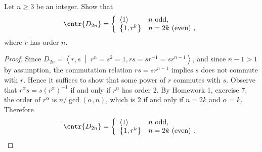 \documentclass[10pt]{amsart}
\begin{document}
\begin{thm}
  Let $n \geq 3$ be an integer.
  Show that 
  $$\cntr{D_{2n}} = \left\{\begin{array}{ll}
  \left<1\right> & n \text{ odd},\\
  \left\{1, r^k\right\} & n = 2k \text{ (even) },
  \end{array}\right.$$
  where $r$ has order $n$.
  \begin{proof}
    Since $D_{2n} = \left<r,s \;\middle\vert\; r^n = s^2 = 1, rs = sr^{-1} = sr^{n-1} \right>$, and since $n - 1 > 1$ by assumption, the commutation relation $rs = sr^{n-1}$ implies $s$ does not commute with $r$.
    Hence it suffices to show that some power of $r$ commutes with $s$.
    Observe that $r^\alpha s = s(r^\alpha)^{-1}$ if and only if $r^\alpha$ has order 2.
    By Homework 1, exercise 7, the order of $r^\alpha$ is $n/\gcd(\alpha,n)$, which is 2 if and only if $n = 2k$ and $\alpha = k$.
    Therefore   $$\cntr{D_{2n}} = \left\{\begin{array}{ll}
    \left<1\right> & n \text{ odd},\\
    \left\{1, r^k\right\} & n = 2k \text{ (even) }.
    \end{array}\right.$$
  \end{proof}
\end{thm}
\end{document}
